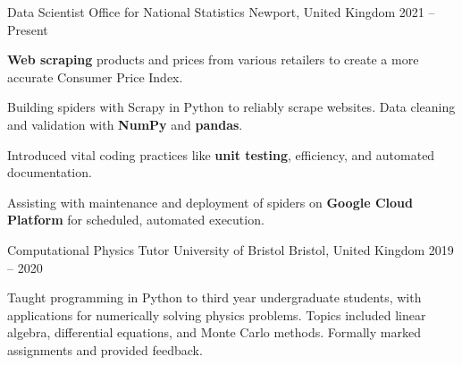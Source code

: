 
\begin{cventries}

    \cventry
        {Data Scientist} %
        {Office for National Statistics} %
        {Newport, United Kingdom} %
        {2021 -- Present} %
        {
            \begin{cvitems} %
                \item{\textbf{Web scraping} products and prices from various retailers to create a more accurate Consumer Price Index.}
                \item{Building spiders with Scrapy in Python to reliably scrape websites. Data cleaning and validation with \textbf{NumPy} and \textbf{pandas}.}
                \item{Introduced vital coding practices like \textbf{unit testing}, efficiency, and automated documentation.}
                \item{Assisting with maintenance and deployment of spiders on \textbf{Google Cloud Platform} for scheduled, automated execution.}
            \end{cvitems}
        }

    \cventry
        {Computational Physics Tutor} %
        {University of Bristol} %
        {Bristol, United Kingdom} %
        {2019 -- 2020} %
        {
            \begin{cvitems} %
                \item{Taught programming in Python to third year undergraduate students, with applications for numerically solving physics problems. Topics included linear algebra, differential equations, and Monte Carlo methods. Formally marked assignments and provided feedback.}
            \end{cvitems}
        }


\end{cventries}
